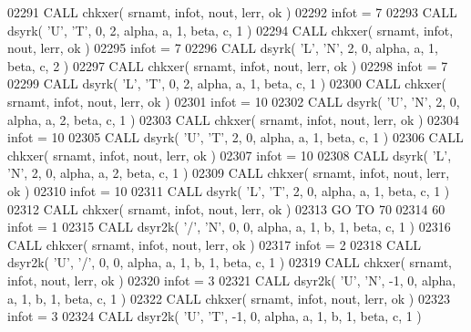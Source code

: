\begin{DoxyCode}
02291       \textcolor{keyword}{CALL }chkxer( srnamt, infot, nout, lerr, ok )
02292       infot = 7
02293       \textcolor{keyword}{CALL }dsyrk( \textcolor{stringliteral}{'U'}, \textcolor{stringliteral}{'T'}, 0, 2, alpha, a, 1, beta, c, 1 )
02294       \textcolor{keyword}{CALL }chkxer( srnamt, infot, nout, lerr, ok )
02295       infot = 7
02296       \textcolor{keyword}{CALL }dsyrk( \textcolor{stringliteral}{'L'}, \textcolor{stringliteral}{'N'}, 2, 0, alpha, a, 1, beta, c, 2 )
02297       \textcolor{keyword}{CALL }chkxer( srnamt, infot, nout, lerr, ok )
02298       infot = 7
02299       \textcolor{keyword}{CALL }dsyrk( \textcolor{stringliteral}{'L'}, \textcolor{stringliteral}{'T'}, 0, 2, alpha, a, 1, beta, c, 1 )
02300       \textcolor{keyword}{CALL }chkxer( srnamt, infot, nout, lerr, ok )
02301       infot = 10
02302       \textcolor{keyword}{CALL }dsyrk( \textcolor{stringliteral}{'U'}, \textcolor{stringliteral}{'N'}, 2, 0, alpha, a, 2, beta, c, 1 )
02303       \textcolor{keyword}{CALL }chkxer( srnamt, infot, nout, lerr, ok )
02304       infot = 10
02305       \textcolor{keyword}{CALL }dsyrk( \textcolor{stringliteral}{'U'}, \textcolor{stringliteral}{'T'}, 2, 0, alpha, a, 1, beta, c, 1 )
02306       \textcolor{keyword}{CALL }chkxer( srnamt, infot, nout, lerr, ok )
02307       infot = 10
02308       \textcolor{keyword}{CALL }dsyrk( \textcolor{stringliteral}{'L'}, \textcolor{stringliteral}{'N'}, 2, 0, alpha, a, 2, beta, c, 1 )
02309       \textcolor{keyword}{CALL }chkxer( srnamt, infot, nout, lerr, ok )
02310       infot = 10
02311       \textcolor{keyword}{CALL }dsyrk( \textcolor{stringliteral}{'L'}, \textcolor{stringliteral}{'T'}, 2, 0, alpha, a, 1, beta, c, 1 )
02312       \textcolor{keyword}{CALL }chkxer( srnamt, infot, nout, lerr, ok )
02313       \textcolor{keywordflow}{GO TO} 70
02314    60 infot = 1
02315       \textcolor{keyword}{CALL }dsyr2k( \textcolor{stringliteral}{'/'}, \textcolor{stringliteral}{'N'}, 0, 0, alpha, a, 1, b, 1, beta, c, 1 )
02316       \textcolor{keyword}{CALL }chkxer( srnamt, infot, nout, lerr, ok )
02317       infot = 2
02318       \textcolor{keyword}{CALL }dsyr2k( \textcolor{stringliteral}{'U'}, \textcolor{stringliteral}{'/'}, 0, 0, alpha, a, 1, b, 1, beta, c, 1 )
02319       \textcolor{keyword}{CALL }chkxer( srnamt, infot, nout, lerr, ok )
02320       infot = 3
02321       \textcolor{keyword}{CALL }dsyr2k( \textcolor{stringliteral}{'U'}, \textcolor{stringliteral}{'N'}, -1, 0, alpha, a, 1, b, 1, beta, c, 1 )
02322       \textcolor{keyword}{CALL }chkxer( srnamt, infot, nout, lerr, ok )
02323       infot = 3
02324       \textcolor{keyword}{CALL }dsyr2k( \textcolor{stringliteral}{'U'}, \textcolor{stringliteral}{'T'}, -1, 0, alpha, a, 1, b, 1, beta, c, 1 )

\end{DoxyCode}
